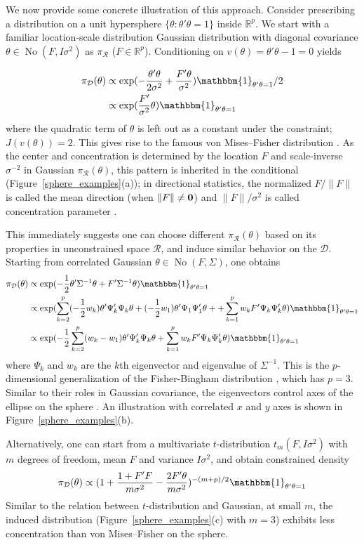 \documentclass[10pt]{article}
\newcommand{\be}{\begin{equation}\begin{aligned}}
\newcommand{\ee}{\end{aligned}\end{equation}}
\newcommand{\bb}[1]{\mathbb{#1}}
\newcommand{\mc}[1]{\mathcal{#1}}
\DeclareMathOperator{\No}{No}
\DeclareMathOperator{\1}{\mathbbm{1}}
\begin{document}
We now provide some concrete illustration of this approach. Consider prescribing
a distribution on a unit hypersphere $\{\theta:
\theta'\theta=1\}$ inside $\bb R^p$. We start with a familiar
location-scale distribution Gaussian distribution with diagonal
covariance $\theta \in \No(F,I\sigma^2)$ as $\pi_{\mc
R}$ ($F\in \bb R^p$). Conditioning on $v(\theta)=\theta'\theta-1=0$ yields

\be
\pi_{\mc D}(\theta) &\propto
\exp(-\frac{\theta'\theta}{2\sigma^2}+\frac{F'\theta}{\sigma^2})
 \mathbbm{1}_{\theta'\theta=1}/2 \\
 & \propto
\exp(\frac{F'}{\sigma^2}\theta)
 \mathbbm{1}_{\theta'\theta=1}
\ee
where the quadratic term of $\theta$ is left out as a constant under
the constraint; $J(v(\theta))=2$. This gives rise to the famous von
Mises--Fisher distribution \citep{khatri1977mises}. As the center and
concentration is determined by the location $F$ and scale-inverse
$\sigma^{-2}$ in Gaussian $\pi_{\mc
	R}(\theta)$, this pattern is inherited in the conditional
	(Figure~\ref{sphere_examples}(a)); in directional statistics, the
normalized ${F}/{\|F\|}$ is called the mean
direction (when $\|F\|\neq \bf 0$) and $\|F\|/\sigma^2$ is called
concentration parameter \citep{khatri1977mises}.

This immediately suggests one can choose different $\pi_{\mc R}(\theta)$
based on its properties in unconstrained space $\mc R$, and induce similar behavior on the $\mc D$. Starting from
correlated Gaussian $\theta \in \No(F,\Sigma)$, one obtains 
\be
\pi_{\mc
D}(\theta) & \propto\exp(-\frac{1}{2}\theta'\Sigma^{-1}\theta+
{F'}{\Sigma^{-1}}\theta) \mathbbm{1}_{\theta'\theta=1} \\
& \propto \exp(\sum_{k=2}^p(-\frac{1}{2}w_k)\theta'\Psi_k'\Psi_k\theta
+ (-\frac{1}{2}w_1)\theta' \Psi_1\Psi'_1\theta+
+ \sum_{k=1}^p w_k F'\Psi_k\Psi'_k\theta ) \mathbbm{1}_{\theta'\theta=1} \\
& \propto \exp(-\frac{1}{2}\sum_{k=2}^p( w_k - w_1)\theta'\Psi_k'\Psi_k\theta
+ \sum_{k=1}^p w_k F'\Psi_k\Psi'_k\theta )\mathbbm{1}_{\theta'\theta=1}
\ee
where $\Psi_k$ and $w_k$ are the $k$th eigenvector and eigenvalue of $\Sigma^{-1}$. This is the $p$-dimensional generalization of the Fisher-Bingham distribution
\citep{mardia1975statistics}, which has $p=3$. Similar to their roles in Gaussian covariance,
the eigenvectors control axes of the ellipse on the sphere
\citep{kent1982fisher}. An illustration with correlated $x$ and $y$ axes is shown in
Figure~\ref{sphere_examples}(b).

Alternatively, one can start from a
multivariate $t$-distribution $t_m(F,I\sigma^2)$ with $m$ degrees of freedom,
mean $F$ and variance $I\sigma^2$, and obtain constrained density 
\be
\pi_{\mc
D}(\theta)\propto
(1+\frac{1+F'F}{m\sigma^2}-\frac{2F'\theta}{m\sigma^2})^{-{(m+p)}/{2}}\mathbbm{1}_{\theta'\theta=1}
\ee
Similar to the relation between $t$-distribution and Gaussian, at small
$m$, the induced distribution (Figure~\ref{sphere_examples}(c) with $m=3$) exhibits less concentration than von
Mises--Fisher on the sphere.
\end{document}
